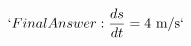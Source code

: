 \documentclass[preview]{standalone}
\begin{document}
\begin{align*}
`Final Answer: \frac{ds}{dt} = 4 \text{ m/s}`
\end{align*}
\end{document}
